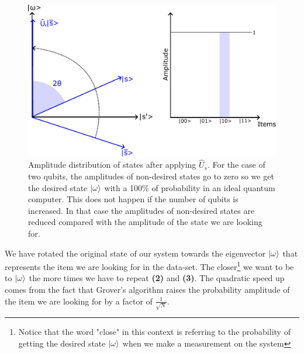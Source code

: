 \begin{figure}[H]
\centering
    \includegraphics[scale=0.55]{Figures/Grover_Step3.pdf}
    \caption{Amplitude distribution of states after applying $\hat{U}_{s}$. For the case of two qubits, the amplitudes of non-desired states go to zero so we get the desired state $\ket{\omega}$ with a 100\% of probability in an ideal quantum computer. This does not happen if the number of qubits is increased. In that case the amplitudes of non-desired states are reduced compared with the amplitude of the state we are looking for.}
    \label{fig:Grover_step3}
\end{figure}

We have rotated the original state of our system towards the eigenvector $\ket{\omega}$ that represents the item we are looking for in the data-set. The closer\footnote{Notice that the word "close" in this context is referring to the probability of getting the desired state $\ket{\omega}$ when we make a measurement on the system} we want to be to $\ket{\omega}$ the more times we have to repeat \textbf{(2)} and \textbf{(3)}. The quadratic speed up comes from the fact that Grover's algorithm raises the probability amplitude of the item we are looking for by a factor of $\frac{1}{\sqrt{N}}$.



